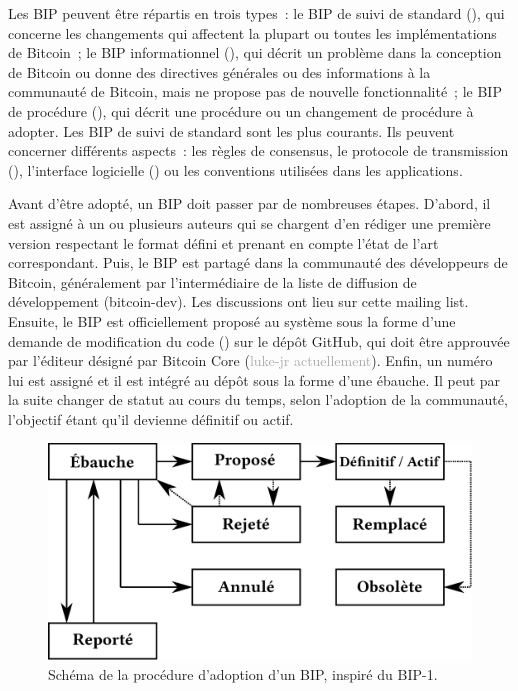 Les BIP peuvent être répartis en trois types~: le BIP de suivi de standard (), qui concerne les changements qui affectent la plupart ou toutes les implémentations de Bitcoin~; le BIP informationnel (), qui décrit un problème dans la conception de Bitcoin ou donne des directives générales ou des informations à la communauté de Bitcoin, mais ne propose pas de nouvelle fonctionnalité~; le BIP de procédure (), qui décrit une procédure ou un changement de procédure à adopter. Les BIP de suivi de standard sont les plus courants. Ils peuvent concerner différents aspects~: les règles de consensus, le protocole de transmission (), l'interface logicielle () ou les conventions utilisées dans les applications.

Avant d'être adopté, un BIP doit passer par de nombreuses étapes. D'abord, il est assigné à un ou plusieurs auteurs qui se chargent d'en rédiger une première version respectant le format défini et prenant en compte l'état de l'art correspondant. Puis, le BIP est partagé dans la communauté des développeurs de Bitcoin, généralement par l'intermédiaire de la liste de diffusion de développement (bitcoin-dev). Les discussions ont lieu sur cette mailing list. Ensuite, le BIP est officiellement proposé au système sous la forme d'une demande de modification du code () sur le dépôt GitHub, qui doit être approuvée par l'éditeur désigné par Bitcoin Core (\textcolor{darkgray}{luke-jr actuellement}). Enfin, un numéro lui est assigné et il est intégré au dépôt sous la forme d'une ébauche. Il peut par la suite changer de statut au cours du temps, selon l'adoption de la communauté, l'objectif étant qu'il devienne définitif ou actif.

\begin{figure}[h]
  \centering
  \includegraphics[scale=0.29]{img/bip-process-fr.eps}
  \caption{Schéma de la procédure d'adoption d'un BIP, inspiré du BIP-1.}
\end{figure}

